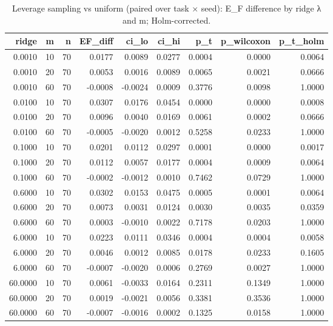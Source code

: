 \begin{table}
\caption{Leverage sampling vs uniform (paired over task × seed): E_F difference by ridge λ and m; Holm-corrected.}
\label{tab:table_leverage_sweep_stats}
\begin{tabular}{rrrrrrrrr}
\toprule
ridge & m & n & EF\_diff & ci\_lo & ci\_hi & p\_t & p\_wilcoxon & p\_t\_holm \\
\midrule
0.0010 & 10 & 70 & 0.0177 & 0.0089 & 0.0277 & 0.0004 & 0.0000 & 0.0064 \\
0.0010 & 20 & 70 & 0.0053 & 0.0016 & 0.0089 & 0.0065 & 0.0021 & 0.0666 \\
0.0010 & 60 & 70 & -0.0008 & -0.0024 & 0.0009 & 0.3776 & 0.0098 & 1.0000 \\
0.0100 & 10 & 70 & 0.0307 & 0.0176 & 0.0454 & 0.0000 & 0.0000 & 0.0008 \\
0.0100 & 20 & 70 & 0.0096 & 0.0040 & 0.0169 & 0.0061 & 0.0002 & 0.0666 \\
0.0100 & 60 & 70 & -0.0005 & -0.0020 & 0.0012 & 0.5258 & 0.0233 & 1.0000 \\
0.1000 & 10 & 70 & 0.0201 & 0.0112 & 0.0297 & 0.0001 & 0.0000 & 0.0017 \\
0.1000 & 20 & 70 & 0.0112 & 0.0057 & 0.0177 & 0.0004 & 0.0009 & 0.0064 \\
0.1000 & 60 & 70 & -0.0002 & -0.0012 & 0.0010 & 0.7462 & 0.0729 & 1.0000 \\
0.6000 & 10 & 70 & 0.0302 & 0.0153 & 0.0475 & 0.0005 & 0.0001 & 0.0064 \\
0.6000 & 20 & 70 & 0.0073 & 0.0031 & 0.0124 & 0.0030 & 0.0035 & 0.0359 \\
0.6000 & 60 & 70 & 0.0003 & -0.0010 & 0.0022 & 0.7178 & 0.0203 & 1.0000 \\
6.0000 & 10 & 70 & 0.0223 & 0.0111 & 0.0346 & 0.0004 & 0.0004 & 0.0058 \\
6.0000 & 20 & 70 & 0.0046 & 0.0012 & 0.0085 & 0.0178 & 0.0233 & 0.1605 \\
6.0000 & 60 & 70 & -0.0007 & -0.0020 & 0.0006 & 0.2769 & 0.0027 & 1.0000 \\
60.0000 & 10 & 70 & 0.0061 & -0.0033 & 0.0164 & 0.2311 & 0.1349 & 1.0000 \\
60.0000 & 20 & 70 & 0.0019 & -0.0021 & 0.0056 & 0.3381 & 0.3536 & 1.0000 \\
60.0000 & 60 & 70 & -0.0007 & -0.0016 & 0.0002 & 0.1325 & 0.0158 & 1.0000 \\
\bottomrule
\end{tabular}
\end{table}
